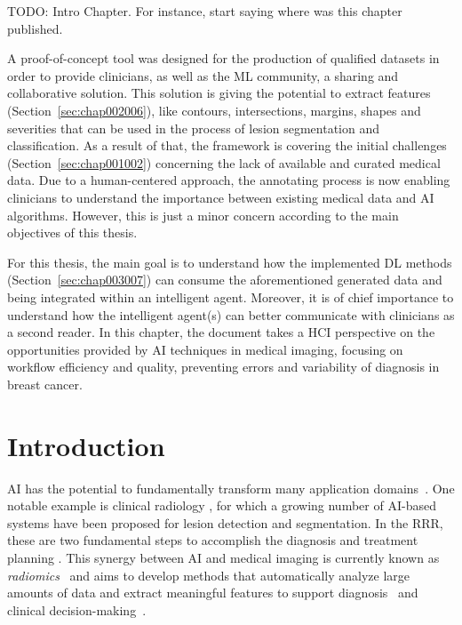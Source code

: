 \clearpage
\label{chap:chap005}

TODO: Intro Chapter. For instance, start saying where was this chapter published.

A proof-of-concept tool was designed for the production of qualified datasets in order to provide clinicians, as well as the \ac{ML} community, a sharing and collaborative solution.
This solution is giving the potential to extract features (Section~\ref{sec:chap002006}), like contours, intersections, margins, shapes and severities that can be used in the process of lesion segmentation and classification.
As a result of that, the framework is covering the initial challenges (Section~\ref{sec:chap001002}) concerning the lack of available and curated medical data.
Due to a human-centered approach, the annotating process is now enabling clinicians to understand the importance between existing medical data and \ac{AI} algorithms.
However, this is just a minor concern according to the main objectives of this thesis.

For this thesis, the main goal is to understand how the implemented \ac{DL} methods (Section~\ref{sec:chap003007}) can consume the aforementioned generated data and being integrated within an intelligent agent.
Moreover, it is of chief importance to understand how the intelligent agent(s) can better communicate with clinicians as a second reader.
In this chapter, the document takes a \ac{HCI} perspective on the opportunities provided by \ac{AI} techniques in medical imaging, focusing on workflow efficiency and quality, preventing errors and variability of diagnosis in breast cancer.

\section{Introduction}
\label{sec:chap005001}

\ac{AI} has the potential to fundamentally transform many application domains~\cite{ghahramani2015probabilistic}.
One notable example is clinical radiology \cite{choy2018current, hosny2018artificial}, for which a growing number of \ac{AI}-based systems have been proposed for lesion detection and segmentation.
In the \ac{RRR}, these are two fundamental steps to accomplish the diagnosis and treatment planning \cite{kooi2017large, graffy2019automated, lakhani2017deep, liang2019deep}.
This synergy between \ac{AI} and medical imaging is currently known as {\it radiomics}~\cite{Lambin2017} and aims to develop methods that automatically analyze large amounts of data and extract meaningful features to support diagnosis~\cite{Ruddle:2016:DEI:2872314.2834117} and clinical decision-making~\cite{Park:2015:TOA:2737795.2656213}.

